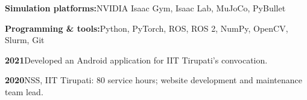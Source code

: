 \textbf{Simulation platforms:}\enspace NVIDIA Isaac Gym, Isaac Lab, MuJoCo, PyBullet\par\vspace{2pt}
\textbf{Programming \& tools:}\enspace Python, PyTorch, ROS, ROS 2, NumPy, OpenCV, Slurm, Git\par\vspace{2pt}
\textbf{2021}\enspace Developed an Android application for IIT Tirupati's convocation.\par\vspace{3pt}
\textbf{2020}\enspace NSS, IIT Tirupati: 80 service hours; website development and maintenance team lead.\par\vspace{3pt}
